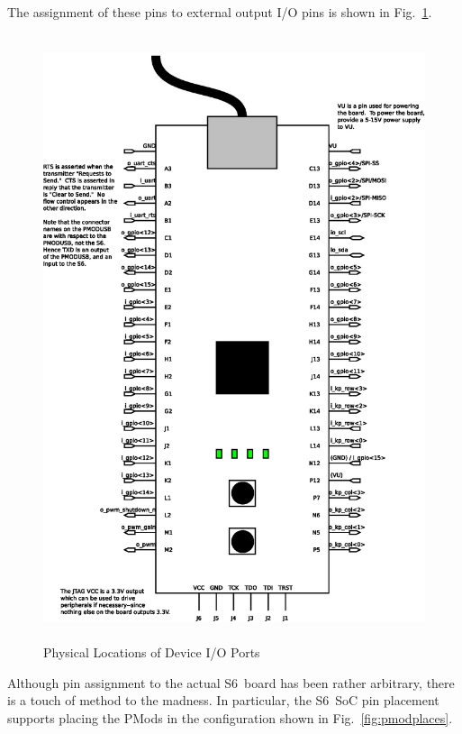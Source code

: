 \documentclass{gqtekspec}
\begin{document}
The assignment of these pins to external output I/O pins is shown in 
Fig.~\ref{fig:physicalio}.
\begin{figure}
\begin{center}
\includegraphics[height=7in]{../gfx/pinout.eps}
\caption{Physical Locations of Device I/O Ports}\label{fig:physicalio}
\end{center}\end{figure}
Although pin assignment to the actual S6~board has been rather arbitrary, there
is a touch of method to the madness.  In particular, the S6~SoC pin placement
supports placing the PMods in the configuration shown in
Fig.~\ref{fig:pmodplaces}.
\end{document}
